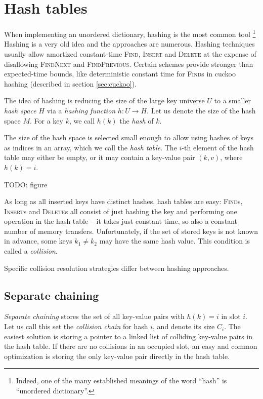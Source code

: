 \chapter{Hash tables}
\label{chapter:hashing}
When implementing an unordered dictionary, hashing is the most common tool
\footnote{Indeed, one of the many established meanings of the word ``hash''
	is ``unordered dictionary''.}
Hashing is a very old idea and the approaches are numerous. Hashing
techniques usually allow amortized constant-time \textsc{Find}, \textsc{Insert}
and \textsc{Delete} at the expense of disallowing \textsc{FindNext} and
\textsc{FindPrevious}. Certain schemes provide stronger than expected-time
bounds, like deterministic constant time for \textsc{Find}s in cuckoo hashing
(described in section \ref{sec:cuckoo}).

The idea of hashing is reducing the size of the large key universe $U$ to
a smaller \emph{hash space} $H$ via a \emph{hashing function}
$h\mathop{:}U\rightarrow H$.
Let us denote the size of the hash space $M$.
For a key $k$, we call $h(k)$ the \emph{hash} of $k$.

The size of the hash space is selected small enough to allow using hashes
of keys as indices in an array, which we call the \emph{hash table}.
The $i$-th element of the hash table may either be empty, or it may contain
a key-value pair $(k,v)$, where $h(k)=i$.

TODO: figure

As long as all inserted keys have distinct hashes, hash tables are easy:
\textsc{Find}s, \textsc{Insert}s and \textsc{Delete}s all consist of just
hashing the key and performing one operation in the hash table -- it takes just
constant time, so also a constant number of memory transfers.
Unfortunately, if the set of stored keys is not known in advance,
some keys $k_1\neq k_2$ may have the same hash value.
This condition is called a \emph{collision}.

Specific collision resolution strategies differ between hashing approaches.

\section{Separate chaining}
\emph{Separate chaining} stores the set of all key-value pairs with
$h(k)=i$ in slot $i$. Let us call this set the \emph{collision chain} for hash
$i$, and denote its size $C_i$. The easiest solution is storing a pointer to
a linked list of colliding key-value pairs in the hash table. If there are no
collisions in an occupied slot, an easy and common optimization is storing
the only key-value pair directly in the hash table.

